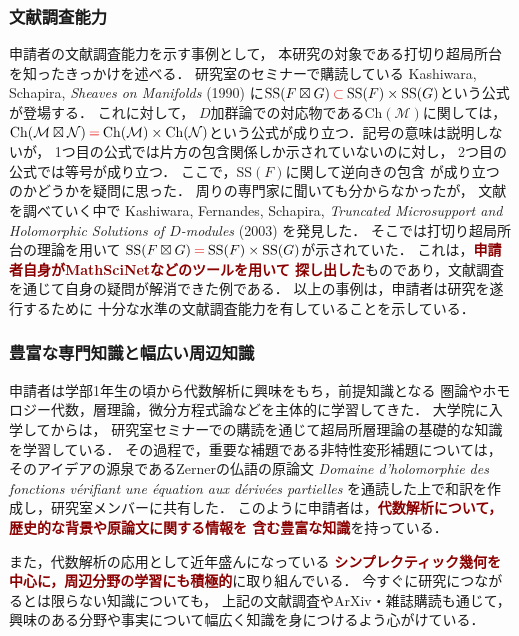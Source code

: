 \documentclass[11pt,a4paper,uplatex,dvipdfmx]{ujarticle} 		%
\newcommand{\研究課題名}{打切り超局所台の関手的性質の研究とMorse理論への応用}
\newcommand{\研究機関名}{北海道大学}
\newcommand{\研究代表者氏名}{大柴寿浩}
\begin{document}
\subsubsection*{文献調査能力}
申請者の文献調査能力を示す事例として，
本研究の対象である打切り超局所台を知ったきっかけを述べる．
研究室のセミナーで購読している Kashiwara, Schapira, 
\textit{Sheaves on Manifolds} (1990) 
に\(
	\mathrm{SS}(F\boxtimes G)
	\mathbin{\textcolor{darkred}{\mathbf{\subset}}} 
	\mathrm{SS}(F)\times\mathrm{SS}(G)
\)という公式が登場する．
これに対して，
\(D\)加群論での対応物である\(\mathrm{Ch}(\mathcal{M})\)に関しては，
\(
	\mathrm{Ch}(\mathcal{M}\boxtimes \mathcal{N})
	\mathbin{\textcolor{darkred}{\mathbf{=}}} 
	\mathrm{Ch}(\mathcal{M})\times\mathrm{Ch}(\mathcal{N})
\)という公式が成り立つ．記号の意味は説明しないが，
1つ目の公式では片方の包含関係しか示されていないのに対し，
2つ目の公式では等号が成り立つ．
ここで，\(\mathrm{SS}(F)\)に関して逆向きの包含
が成り立つのかどうかを疑問に思った．
周りの専門家に聞いても分からなかったが，
文献を調べていく中で Kashiwara, Fernandes, Schapira, 
\textit{Truncated Microsupport and 
Holomorphic Solutions of \(D\)-modules} (2003) を発見した．
そこでは打切り超局所台の理論を用いて
\(
	\mathrm{SS}(F\boxtimes G)
	\mathbin{\textcolor{darkred}{\mathbf{=}}} 
	\mathrm{SS}(F)\times\mathrm{SS}(G)
\)が示されていた．
これは，\textcolor{darkred}{\textbf{申請者自身がMathSciNetなどのツールを用いて
探し出した}}ものであり，文献調査を通じて自身の疑問が解消できた例である．
以上の事例は，申請者は研究を遂行するために
十分な水準の文献調査能力を有していることを示している．
\subsubsection*{豊富な専門知識と幅広い周辺知識}
申請者は学部1年生の頃から代数解析に興味をもち，前提知識となる
圏論やホモロジー代数，層理論，微分方程式論などを主体的に学習してきた．
大学院に入学してからは，
研究室セミナーでの購読を通じて超局所層理論の基礎的な知識を学習している．
その過程で，重要な補題である非特性変形補題については，
そのアイデアの源泉であるZernerの仏語の原論文
\textit{Domaine d'holomorphie des fonctions v\'erifiant 
une \'equation aux d\'eriv\'ees partielles} 
を通読した上で和訳を作成し，研究室メンバーに共有した．
このように申請者は，\textcolor{darkred}{\textbf{代数解析について，
歴史的な背景や原論文に関する情報を
含む豊富な知識}}を持っている．

また，代数解析の応用として近年盛んになっている
\textcolor{darkred}{\textbf{シンプレクティック幾何を中心に，周辺分野の学習にも積極的}}に取り組んでいる．
今すぐに研究につながるとは限らない知識についても，
上記の文献調査やArXiv・雑誌購読も通じて，
興味のある分野や事実について幅広く知識を身につけるよう心がけている．
\end{document}
